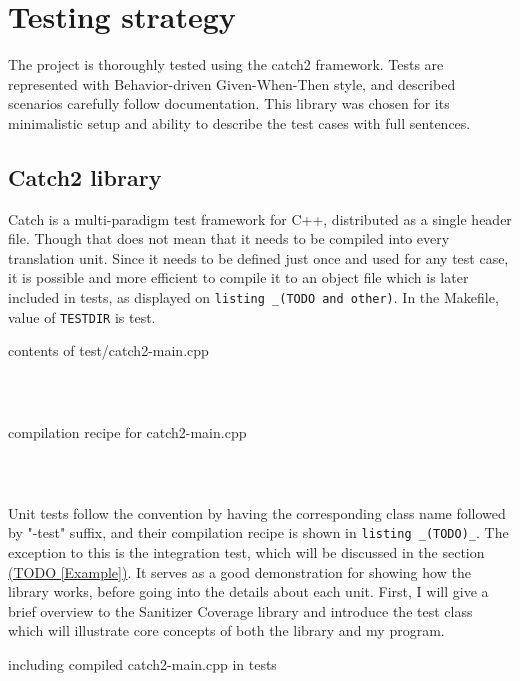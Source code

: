 \documentclass{elteikthesis}[2018/06/06]
\begin{document}
\section{Testing strategy}
\label{sec-3-3}
The project is thoroughly tested using the catch2 framework. Tests are represented with Behavior-driven Given-When-Then style, and described scenarios carefully follow documentation. This library was chosen for its minimalistic setup and ability to describe the test cases with full sentences. \\

\subsection{Catch2 library}
\label{sec-3-3-1}
Catch is a multi-paradigm test framework for C++, distributed as a single header file. Though that does not mean that it needs to be compiled into every translation unit.  Since it needs to be defined just once and used for any test case, it is possible and more efficient to compile it to an object file which is later included in tests, as displayed on \texttt{listing \_(TODO and other)}. In the Makefile, value of \lstinline{TESTDIR} is test. \\

\begin{listing}
\caption{contents of test/catch2-main.cpp}
\inputminted{c++}{test/catch2-main.cpp} \\
\end{listing}

\begin{listing}
\caption{compilation recipe for catch2-main.cpp}
\inputminted[firstline=67,lastline=72]{bash}{Makefile} \\
\end{listing}

Unit tests follow the convention by having the corresponding class name followed by "-test" suffix, and their compilation recipe is shown in \texttt{listing \_(TODO)\_}. The exception to this is the integration test, which will be discussed in the section \uline{(TODO [Example])}. It serves as a good demonstration for showing how the library works, before going into the details about each unit. First, I will give a brief overview to the Sanitizer Coverage library and introduce the test class which will illustrate core concepts of both the library and my program. \\

\begin{listing}
\caption{including compiled catch2-main.cpp in tests}
\inputminted[firstline=74,lastline=90]{bash}{Makefile} \\
\end{listing}
\end{document}
